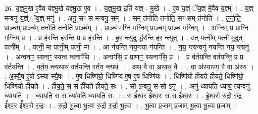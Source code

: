 \documentclass[17pt]{extarticle}
\begin{document}
26. य॒ज्ञ्॒मु॒ख ए॒वैव य॑ज्ञ्मु॒खे य॑ज्ञ्मु॒ख ए॒व । . य॒ज्ञ्॒मु॒ख इति॑ यज्ञ् - मु॒खे । . ए॒व य॒ज्ञ्ं ॅय॒ज्ञ् मे॒वैव य॒ज्ञ्म् । . य॒ज्ञ् मन्वनु॑ य॒ज्ञ्ं ॅय॒ज्ञ् मनु॑ । . अनु॒ सꣳ स मन्वनु॒ सम् । . सम् त॑नोति तनोति॒ सꣳ सम् त॑नोति । . त॒नो॒ति॒ प्राञ्च॒म् प्राञ्च॑म् तनोति तनोति॒ प्राञ्च᳚म् । . प्राञ्च॑ म॒ग्नि म॒ग्निम् प्राञ्च॒म् प्राञ्च॑ म॒ग्निम् । . अ॒ग्निम् प्र प्राग्नि म॒ग्निम् प्र । . प्र ह॑रन्ति हरन्ति॒ प्र प्र ह॑रन्ति । . ह॒र॒ न्त्युदु द्ध॑रन्ति हर॒ न्त्युत् । . उत् पत्नी॒म् पत्नी॒ मुदुत् पत्नी᳚म् । . पत्नी॒ मा पत्नी॒म् पत्नी॒ मा । . आ न॑यन्ति नय॒न्त्या न॑यन्ति । . न॒य॒ न्त्यन्वनु॑ नयन्ति नय॒ न्त्यनु॑ । . अन्वनाꣳ॒॒ स्यनाꣳ॒॒ स्यन्व न्वनाꣳ॑सि । . अनाꣳ॑सि॒ प्र प्राणाꣳ॒॒ स्यनाꣳ॑सि॒ प्र । . प्र व॑र्तयन्ति वर्तयन्ति॒ प्र प्र व॑र्तयन्ति । . व॒र्त॒य॒ न्त्यथाथ॑ वर्तयन्ति वर्तय॒ न्त्यथ॑ । . अथ॒ वै वा अथाथ॒ वै । . वा अ॑स्यास्य॒ वै वा अ॑स्य । . अ॒स्यै॒ष ए॒षो᳚ ऽस्या स्यै॒षः । . ए॒ष धिष्णि॑यो॒ धिष्णि॑य ए॒ष ए॒ष धिष्णि॑यः । . धिष्णि॑यो हीयते हीयते॒ धिष्णि॑यो॒ धिष्णि॑यो हीयते । . ही॒य॒ते॒ स स ही॑यते हीयते॒ सः । . सो ऽन्वनु॒ स सो ऽनु॑ । . अनु॑ ध्यायति ध्याय॒ त्यन्वनु॑ ध्यायति । . ध्या॒य॒ति॒ स स ध्या॑यति ध्यायति॒ सः । . स ई᳚श्व॒र ई᳚श्व॒रः स स ई᳚श्व॒रः । . ई॒श्व॒रो रु॒द्रो रु॒द्र ई᳚श्व॒र ई᳚श्व॒रो रु॒द्रः । . रु॒द्रो भू॒त्वा भू॒त्वा रु॒द्रो रु॒द्रो भू॒त्वा । . भू॒त्वा प्र॒जाम् प्र॒जाम् भू॒त्वा भू॒त्वा प्र॒जाम् । \newline
\end{document}
